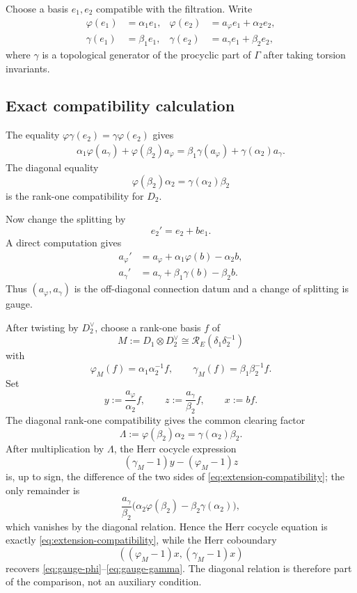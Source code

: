 \documentclass[11pt]{article}
\theoremstyle{definition}
\newcommand{\cR}{\mathcal R}
\begin{document}
Choose a basis $e_1,e_2$ compatible with the filtration.  Write
\begin{align}
\varphi(e_1)&=\alpha_1e_1,
&\varphi(e_2)&=a_\varphi e_1+\alpha_2e_2,\label{eq:phi-matrix}\\
\gamma(e_1)&=\beta_1e_1,
&\gamma(e_2)&=a_\gamma e_1+\beta_2e_2,\label{eq:gamma-matrix}
\end{align}
where $\gamma$ is a topological generator of the procyclic part of $\Gamma$ after taking torsion invariants.

\subsection{Exact compatibility calculation}

The equality $\varphi\gamma(e_2)=\gamma\varphi(e_2)$ gives
\begin{align}
\alpha_1\varphi(a_\gamma)+\varphi(\beta_2)a_\varphi
=
\beta_1\gamma(a_\varphi)+\gamma(\alpha_2)a_\gamma.
\label{eq:extension-compatibility}
\end{align}
The diagonal equality
\[
\varphi(\beta_2)\alpha_2=\gamma(\alpha_2)\beta_2
\]
is the rank-one compatibility for $D_2$.

Now change the splitting by
\[
e_2'=e_2+b e_1.
\]
A direct computation gives
\begin{align}
 a_\varphi'&=a_\varphi+\alpha_1\varphi(b)-\alpha_2b,\label{eq:gauge-phi}\\
 a_\gamma'&=a_\gamma+\beta_1\gamma(b)-\beta_2b.\label{eq:gauge-gamma}
\end{align}
Thus $(a_\varphi,a_\gamma)$ is the off-diagonal connection datum and a change of splitting is gauge.

After twisting by $D_2^\vee$, choose a rank-one basis $f$ of
\[
M:=D_1\otimes D_2^\vee\cong \cR_E(\delta_1\delta_2^{-1})
\]
with
\[
\varphi_M(f)=\alpha_1\alpha_2^{-1}f,
\qquad
\gamma_M(f)=\beta_1\beta_2^{-1}f.
\]
Set
\begin{equation}\label{eq:herr-normalization}
y:=\frac{a_\varphi}{\alpha_2}f,
\qquad
z:=\frac{a_\gamma}{\beta_2}f,
\qquad
x:=bf.
\end{equation}
The diagonal rank-one compatibility gives the common clearing factor
\[
\Lambda:=\varphi(\beta_2)\alpha_2
=\gamma(\alpha_2)\beta_2.
\]
After multiplication by $\Lambda$, the Herr cocycle expression
\[
(\gamma_M-1)y-(\varphi_M-1)z
\]
is, up to sign, the difference of the two sides of \eqref{eq:extension-compatibility}; the only remainder is
\[
\frac{a_\gamma}{\beta_2}
\bigl(\alpha_2\varphi(\beta_2)-\beta_2\gamma(\alpha_2)\bigr),
\]
which vanishes by the diagonal relation.  Hence the Herr cocycle equation is exactly \eqref{eq:extension-compatibility}, while the Herr coboundary
\[
((\varphi_M-1)x,(\gamma_M-1)x)
\]
recovers \eqref{eq:gauge-phi}--\eqref{eq:gauge-gamma}.  The diagonal relation is therefore part of the comparison, not an auxiliary condition.
\end{document}

